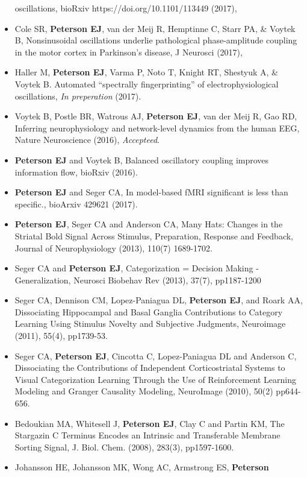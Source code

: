 \begin{itemize}
  oscillations, bioRxiv https://doi.org/10.1101/113449 (2017),
\item
  Cole SR, \textbf{Peterson EJ}, van der Meij R, Hemptinne C, Starr PA,
  \& Voytek B, Nonsinusoidal oscillations underlie pathological
  phase-amplitude coupling in the motor cortex in Parkinson's disease, J
  Neurosci (2017),
\item
  Haller M, \textbf{Peterson EJ}, Varma P, Noto T, Knight RT, Shestyuk
  A, \& Voytek B. Automated ``spectrally fingerprinting'' of
  electrophysiological oscillations, \emph{In preperation} (2017).
\item
  Voytek B, Postle BR, Watrous AJ, \textbf{Peterson EJ}, van der Meij R,
  Gao RD, Inferring neurophysiology and network-level dynamics from the
  human EEG, Nature Neuroscience (2016), \emph{Accepteed}.
\item
  \textbf{Peterson EJ} and Voytek B, Balanced oscillatory coupling
  improves information flow, bioRxiv (2016).
\item
  \textbf{Peterson EJ} and Seger CA, In model-based fMRI significant is
  less than specific., bioArxiv 429621 (2017).
\item
  \textbf{Peterson EJ}, Seger CA and Anderson CA, Many Hats: Changes in
  the Striatal Bold Signal Across Stimulus, Preparation, Response and
  Feedback, Journal of Neurophysiology (2013), 110(7) 1689-1702.
\item
  Seger CA and \textbf{Peterson EJ}, Categorization = Decision Making -
  Generalization, Neurosci Biobehav Rev (2013), 37(7), pp1187-1200
\item
  Seger CA, Dennison CM, Lopez-Paniagua DL, \textbf{Peterson EJ}, and
  Roark AA, Dissociating Hippocampal and Basal Ganglia Contributions to
  Category Learning Using Stimulus Novelty and Subjective Judgments,
  Neuroimage (2011), 55(4), pp1739-53.
\item
  Seger CA, \textbf{Peterson EJ}, Cincotta C, Lopez-Paniagua DL and
  Anderson C, Dissociating the Contributions of Independent
  Corticostriatal Systems to Visual Categorization Learning Through the
  Use of Reinforcement Learning Modeling and Granger Causality Modeling,
  NeuroImage (2010), 50(2) pp644-656.
\item
  Bedoukian MA, Whitesell J, \textbf{Peterson EJ}, Clay C and Partin KM,
  The Stargazin C Terminus Encodes an Intrinsic and Transferable
  Membrane Sorting Signal, J. Biol. Chem. (2008), 283(3), pp1597-1600.
\item
  Johansson HE, Johansson MK, Wong AC, Armstrong ES, \textbf{Peterson
}
\end{itemize}
